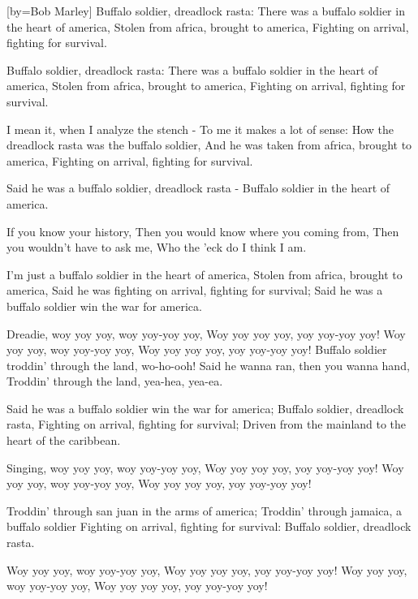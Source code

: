 [by={Bob Marley}]
\beginverse
Buffalo soldier, dreadlock rasta: 
There was a buffalo soldier in the heart of america, 
Stolen from africa, brought to america, 
Fighting on arrival, fighting for survival. 
\endverse

\beginverse
Buffalo soldier, dreadlock rasta: 
There was a buffalo soldier in the heart of america, 
Stolen from africa, brought to america, 
Fighting on arrival, fighting for survival. 
\endverse

\beginverse
I mean it, when I analyze the stench - 
To me it makes a lot of sense: 
How the dreadlock rasta was the buffalo soldier, 
And he was taken from africa, brought to america, 
Fighting on arrival, fighting for survival. 
\endverse

\beginverse
Said he was a buffalo soldier, dreadlock rasta - 
Buffalo soldier in the heart of america. 
\endverse

\beginverse
If you know your history, 
Then you would know where you coming from, 
Then you wouldn't have to ask me, 
Who the 'eck do I think I am. 
\endverse

\beginverse 
I'm just a buffalo soldier in the heart of america, 
Stolen from africa, brought to america, 
Said he was fighting on arrival, fighting for survival; 
Said he was a buffalo soldier win the war for america. 
\endverse

\beginchorus
Dreadie, woy yoy yoy, woy yoy-yoy yoy, 
Woy yoy yoy yoy, yoy yoy-yoy yoy! 
Woy yoy yoy, woy yoy-yoy yoy, 
Woy yoy yoy yoy, yoy yoy-yoy yoy! 
Buffalo soldier troddin' through the land, wo-ho-ooh! 
Said he wanna ran, then you wanna hand, 
Troddin' through the land, yea-hea, yea-ea. 
\endchorus

\beginverse 
Said he was a buffalo soldier win the war for america; 
Buffalo soldier, dreadlock rasta, 
Fighting on arrival, fighting for survival; 
Driven from the mainland to the heart of the caribbean. 
\endverse

\beginchorus
Singing, woy yoy yoy, woy yoy-yoy yoy, 
Woy yoy yoy yoy, yoy yoy-yoy yoy! 
Woy yoy yoy, woy yoy-yoy yoy, 
Woy yoy yoy yoy, yoy yoy-yoy yoy! 
\endchorus

\beginverse 
Troddin' through san juan in the arms of america; 
Troddin' through jamaica, a buffalo soldier 
Fighting on arrival, fighting for survival: 
Buffalo soldier, dreadlock rasta. 
\endverse

\beginchorus
Woy yoy yoy, woy yoy-yoy yoy, 
Woy yoy yoy yoy, yoy yoy-yoy yoy! 
Woy yoy yoy, woy yoy-yoy yoy, 
Woy yoy yoy yoy, yoy yoy-yoy yoy!
\endchorus

\endsong
